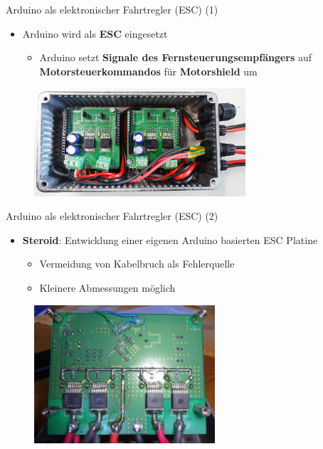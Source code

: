 \documentclass{beamer}
\begin{document}
\begin{frame}{Arduino als elektronischer Fahrtregler (ESC) (1)}
\begin{itemize}
	\item Arduino wird als \textbf{ESC} eingesetzt
	\begin{itemize}
		\item Arduino setzt \textbf{Signale des Fernsteuerungsempf\"angers} auf \textbf{Motorsteuerkommandos} f\"ur \textbf{Motorshield} um
	\end{itemize}
\end{itemize}
 \begin{figure}[H]
 	\centering
 	\includegraphics[width=0.7\textwidth]{./images/arduino-schnauzer.jpg}
 \end{figure}
\end{frame}
\begin{frame}{Arduino als elektronischer Fahrtregler (ESC) (2)}
\begin{itemize}
	\item \textbf{Steroid}: Entwicklung einer eigenen Arduino basierten ESC Platine
	\begin{itemize}
		\item Vermeidung von Kabelbruch als Fehlerquelle
		\item Kleinere Abmessungen m\"oglich
	\end{itemize}
\end{itemize}
\begin{figure}[H]
 	\centering
 	\includegraphics[width=0.6\textwidth]{./images/arduino-steroid.jpg}
\end{figure}
\end{frame}
\end{document}
